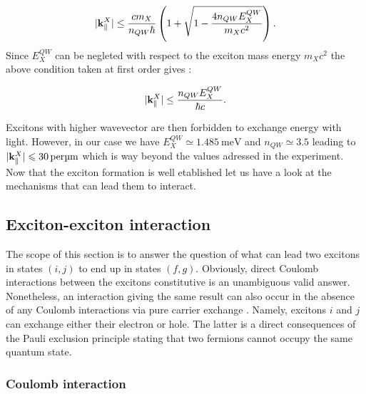 \begin{equation}
    |\mathbf{k}_\parallel^X| \leq \dfrac{cm_X}{n_{QW}\hbar}\left(1+\sqrt{1-\dfrac{4n_{QW}E_X^{QW}}{m_Xc^2}} \right).
    \label{eq:k_max}
\end{equation}
Since $E_X^{QW}$ can be negleted with respect to the exciton mass energy $m_Xc^2$ the above condition taken at first order gives :

\begin{equation}
    |\mathbf{k}_\parallel^X| \leq \dfrac{n_{QW}E_X^{QW}}{\hbar c}.
    \label{eq:kmax_approx}
\end{equation}


\noindent Excitons with higher wavevector are then forbidden to exchange energy with light. However, in our case we have $E_X^{QW} \simeq \SI{1.485}{\milli\electronvolt}$ and $n_{QW} \simeq 3.5$ leading to $|\mathbf{k}_\parallel^X| \leqslant \SI{30}{per \micro\meter}$ which is way beyond
the values adressed in the experiment. Now that the exciton formation is well etablished let us have a look at the mechanisms that can lead them to interact.
 

\subsection{Exciton-exciton interaction}
\label{sub:exciton_exciton_interaction}

The scope of this section is to answer the question of what can lead two excitons in states $(i,j)$ to end up in states $(f,g)$. Obviously, direct
Coulomb interactions between the excitons constitutive is an unambiguous valid answer. Nonetheless, an interaction giving the same result can also occur in the absence of any Coulomb interactions via pure carrier exchange \cite{Combescot_2007_exact_pol_pol_interactions}.
Namely, excitons $i$ and $j$ can exchange either their electron or hole. The latter is a direct consequences of the Pauli exclusion principle stating that two fermions cannot occupy the same quantum state. 


\subsubsection{Coulomb interaction}

